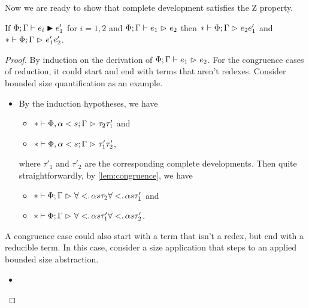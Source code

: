 Now we are ready to show that complete development satisfies the Z property.

\begin{lemma} \label{lem:Z-property}
If $\develop{\Phi; \Gamma}{e_i}{e'_1}$ for $i = 1, 2$
and $\red{\Phi; \Gamma}{e_1}{e_2}$
then $\red*{\Phi; \Gamma}{e_2}{e'_1}$
and $\red*{\Phi; \Gamma}{e'_1}{e'_2}$.
\end{lemma}

\begin{proof}
By induction on the derivation of $\red{\Phi; \Gamma}{e_1}{e_2}$.
For the congruence cases of reduction,
it could start and end with terms that aren't redexes.
Consider bounded size quantification as an example.
\begin{itemize}[noitemsep, label=\textbf{Case}, leftmargin=*, labelindent=\parindent]
  \item \phantom{Never gonna give you up}
  \vspace{-2\baselineskip}
  \begin{mathpar}
  \end{mathpar}
  By the induction hypotheses, we have
  \begin{itemize}[noitemsep]
    \item $\red*{\Phi, \bound{\alpha}{s}; \Gamma}{\tau_2}{\tau'_1}$ and
    \item $\red*{\Phi, \bound{\alpha}{s}; \Gamma}{\tau'_1}{\tau'_2}$,
  \end{itemize}
  where $\tau'_1$ and $\tau'_2$ are the corresponding complete developments.
  Then quite straightforwardly, by \cref{lem:congruence}, we have
  \begin{itemize}[noitemsep]
    \item $\red*{\Phi; \Gamma}{\Funtype<{\alpha}{s}{\tau_2}}{\Funtype<{\alpha}{s}{\tau'_1}}$ and
    \item $\red*{\Phi; \Gamma}{\Funtype<{\alpha}{s}{\tau'_1}}{\Funtype<{\alpha}{s}{\tau'_2}}$.
  \end{itemize}
\end{itemize}
A congruence case could also start with a term that isn't a redex,
but end with a reducible term.
In this case, consider a size application that steps to an applied bounded size abstraction.
\begin{itemize}[noitemsep, label=\textbf{Case}, leftmargin=*, labelindent=\parindent]
  \item \phantom{Never gonna let you down}

\end{itemize}
\end{proof}
